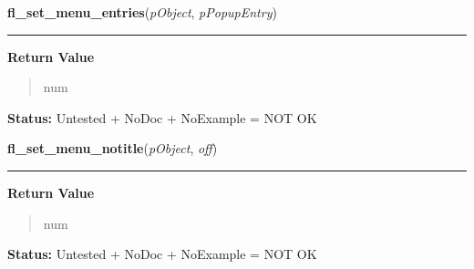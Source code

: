     \label{xformslib:library:fl_set_menu_entries}

    \vspace{0.5ex}

\hspace{.8\funcindent}\begin{boxedminipage}{\funcwidth}

    \raggedright \textbf{fl\_set\_menu\_entries}(\textit{pObject}, \textit{pPopupEntry})

    \vspace{-1.5ex}

    \rule{\textwidth}{0.5\fboxrule}
\setlength{\parskip}{2ex}
\setlength{\parskip}{1ex}
      \textbf{Return Value}
    \vspace{-1ex}

      \begin{quote}
      num

      \end{quote}

\textbf{Status:} Untested + NoDoc + NoExample = NOT OK



    \end{boxedminipage}

    \label{xformslib:library:fl_set_menu_notitle}

    \vspace{0.5ex}

\hspace{.8\funcindent}\begin{boxedminipage}{\funcwidth}

    \raggedright \textbf{fl\_set\_menu\_notitle}(\textit{pObject}, \textit{off})

    \vspace{-1.5ex}

    \rule{\textwidth}{0.5\fboxrule}
\setlength{\parskip}{2ex}
\setlength{\parskip}{1ex}
      \textbf{Return Value}
    \vspace{-1ex}

      \begin{quote}
      num

      \end{quote}

\textbf{Status:} Untested + NoDoc + NoExample = NOT OK



    \end{boxedminipage}

